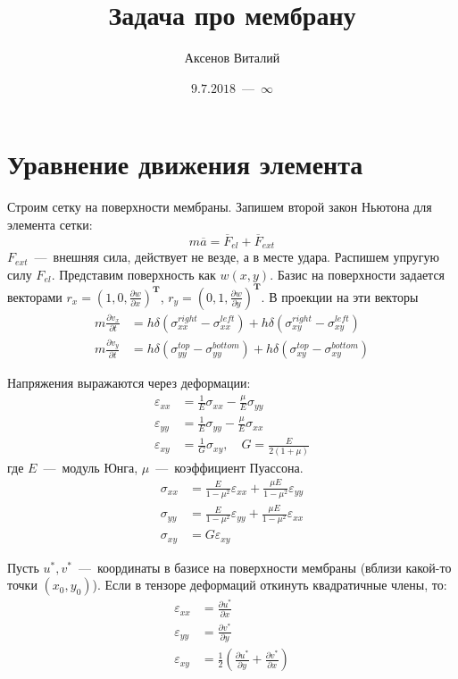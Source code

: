 \documentclass[12pt,a4paper,fleqn]{article}
\title{Задача про мембрану}
\author{Аксенов Виталий}
\date{$9.7.2018$~---~$\infty$}
\begin{document}
\maketitle
\thispagestyle{empty}



\section{Уравнение движения элемента}
Строим сетку на поверхности мембраны. Запишем второй закон Ньютона для элемента сетки:
\begin{equation}
	m\overline{a} = \overline{F}_{el} + \overline{F}_{ext}
\end{equation}
$F_{ext}$~---~внешняя сила, действует не везде, а в месте удара.
Распишем упругую силу $F_{el}$.
Представим поверхность как $w(x,y)$. Базис на поверхности задается векторами $r_x=(1, 0, \frac{\partial w}{\partial x})^\mathbf{T}$,  $r_y=(0, 1, \frac{\partial w}{\partial y})^\mathbf{T}$.
В проекции на эти векторы
\begin{align}
	m\frac{\partial v_x}{\partial t} &= h\delta(\sigma_{xx}^{right} - \sigma_{xx}^{left}) + h\delta(\sigma_{xy}^{right} - \sigma_{xy}^{left}) \\
	m\frac{\partial v_y}{\partial t} &= h\delta(\sigma_{yy}^{top} - \sigma_{yy}^{bottom}) + h\delta(\sigma_{xy}^{top} - \sigma_{xy}^{bottom})
\end{align}

Напряжения выражаются через деформации:
\begin{align}
	\varepsilon_{xx} &= \frac{1}{E}\sigma_{xx} -\frac{\mu}{E}\sigma_{yy} \\
	\varepsilon_{yy} &= \frac{1}{E}\sigma_{yy} -\frac{\mu}{E}\sigma_{xx} \\
	\varepsilon_{xy} &= \frac{1}{G}\sigma_{xy}, \quad G = \frac{E}{2(1 + \mu)}
\end{align}
где $E$~---~модуль Юнга, $\mu$~---~коэффициент Пуассона.
\begin{align}
	\sigma_{xx} &= \frac{E}{1 - \mu^2}\varepsilon_{xx} + \frac{\mu E}{1 - \mu^2}\varepsilon_{yy} \\
	\sigma_{yy} &= \frac{E}{1 - \mu^2}\varepsilon_{yy} + \frac{\mu E}{1 - \mu^2}\varepsilon_{xx} \\
	\sigma_{xy} &= G\varepsilon_{xy}
\end{align}

Пусть $u^*, v^*$~---~координаты в базисе на поверхности мембраны (вблизи какой-то точки $(x_0, y_0)$). Если в тензоре деформаций откинуть квадратичные члены, то:
\begin{align}
	\varepsilon_{xx} &= \frac{\partial u^*}{\partial x} \\
	\varepsilon_{yy} &= \frac{\partial v^*}{\partial y} \\
	\varepsilon_{xy} &= \frac{1}{2} \left( \frac{\partial u^*}{\partial y} + \frac{\partial v^*}{\partial x}  \right)
\end{align}
\end{document}
